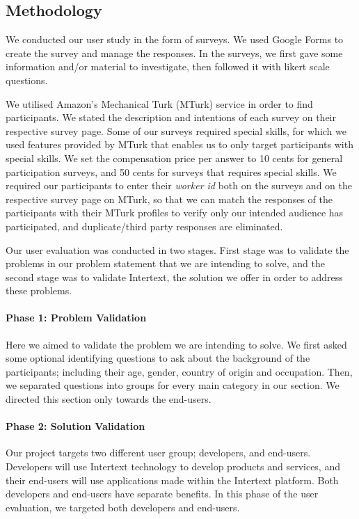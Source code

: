 \subsection{Methodology}

We conducted our user study in the form of surveys. We used Google Forms to create the survey and manage the responses. In the surveys, we first gave some information and/or material to investigate, then followed it with likert scale questions.

We utilised Amazon's Mechanical Turk (MTurk) service in order to find participants. We stated the description and intentions of each survey on their respective survey page. Some of our surveys required special skills, for which we used features provided by MTurk that enables us to only target participants with special skills. We set the compensation price per answer to 10 cents for general participation surveys, and 50 cents for surveys that requires special skills. We required our participants to enter their \textit{worker id} both on the surveys and on the respective survey page on MTurk, so that we can match the responses of the participants with their MTurk profiles to verify only our intended audience has participated, and duplicate/third party responses are eliminated.

Our user evaluation was conducted in two stages. First stage was to validate the problems in our problem statement that we are intending to solve, and the second stage was to validate Intertext, the solution we offer in order to address these problems. 

\paragraph{Phase 1: Problem Validation}

Here we aimed to validate the problem we are intending to solve. We first asked some optional identifying questions to ask about the background of the participants; including their age, gender, country of origin and occupation. Then, we separated questions into groups for every main category in our  section. We directed this section only towards the end-users.

\paragraph{Phase 2: Solution Validation}

Our project targets two different user group; developers, and end-users. Developers will use Intertext technology to develop products and services, and their end-users will use applications made within the Intertext platform. Both developers and end-users have separate benefits. In this phase of the user evaluation, we targeted both developers and end-users. 


